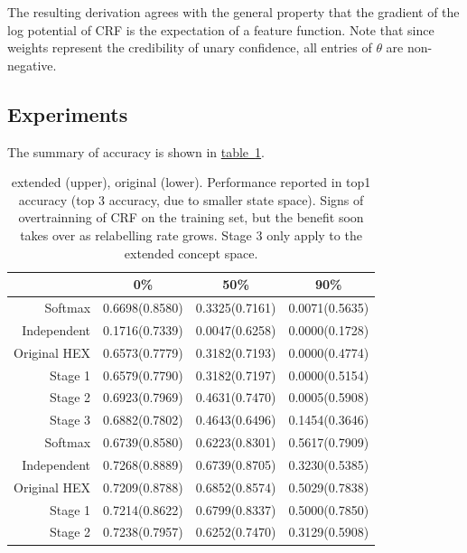 \documentclass[11pt,a4paper]{article}
\begin{document}
The resulting derivation agrees with the general property that the gradient of the log potential of CRF is the expectation of a feature function. Note that since weights represent the credibility of unary confidence, all entries of $\theta$ are non-negative.

\subsection{Experiments}
\label{sec:exp2}

The summary of accuracy is shown in \hyperref[tab:summary]{table~\ref{tab:summary}}.

\begin{table}[htbp]
\centering
\begin{tabular}{r|c|c|c}
 & 0\% & 50\% & 90\%\\
\hline
Softmax & 0.6698(0.8580) & 0.3325(0.7161) & 0.0071(0.5635)\\
Independent & 0.1716(0.7339) & 0.0047(0.6258) & 0.0000(0.1728)\\
Original HEX & 0.6573(0.7779) & 0.3182(0.7193) & 0.0000(0.4774)\\
Stage 1 & 0.6579(0.7790) & 0.3182(0.7197) & 0.0000(0.5154)\\
Stage 2 & 0.6923(0.7969) & 0.4631(0.7470) & 0.0005(0.5908)\\
Stage 3 & 0.6882(0.7802) & 0.4643(0.6496) & 0.1454(0.3646)\\
\hline
Softmax & 0.6739(0.8580) & 0.6223(0.8301) & 0.5617(0.7909)\\
Independent & 0.7268(0.8889) & 0.6739(0.8705) & 0.3230(0.5385)\\
Original HEX & 0.7209(0.8788) & 0.6852(0.8574) & 0.5029(0.7838)\\
Stage 1 & 0.7214(0.8622) & 0.6799(0.8337) & 0.5000(0.7850)\\
Stage 2 & 0.7238(0.7957) & 0.6252(0.7470) & 0.3129(0.5908)
\end{tabular}
\caption{extended (upper), original (lower). Performance reported in top1 accuracy (top 3 accuracy, due to smaller state space). Signs of overtrainning of CRF on the training set, but the benefit soon takes over as relabelling rate grows. Stage 3 only apply to the extended concept space.}
\label{tab:summary}
\end{table}
\end{document}
